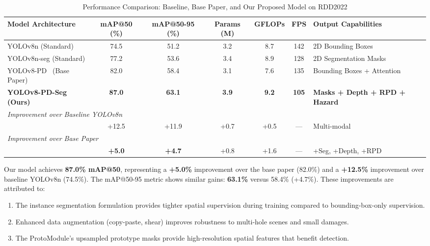 \documentclass[conference]{IEEEtran}
\begin{document}
\begin{table}[!t]
\centering
\caption{Performance Comparison: Baseline, Base Paper, and Our Proposed Model on RDD2022}
\label{tab:benchmark}
\renewcommand{\arraystretch}{1.15}
\begin{tabular}{@{}lcccccl@{}}
\toprule
\textbf{Model Architecture} & \textbf{mAP@50 (\%)} & \textbf{mAP@50-95 (\%)} & \textbf{Params (M)} & \textbf{GFLOPs} & \textbf{FPS} & \textbf{Output Capabilities} \\
\midrule
YOLOv8n (Standard) & 74.5 & 51.2 & 3.2 & 8.7 & 142 & 2D Bounding Boxes \\
YOLOv8n-seg (Standard) & 77.2 & 53.6 & 3.4 & 8.9 & 128 & 2D Segmentation Masks \\
YOLOv8-PD~\cite{zeng2024yolov8pd} (Base Paper) & 82.0 & 58.4 & 3.1 & 7.6 & 135 & Bounding Boxes + Attention \\
\midrule
\textbf{YOLOv8-PD-Seg (Ours)} & \textbf{87.0} & \textbf{63.1} & \textbf{3.9} & \textbf{9.2} & \textbf{105} & \textbf{Masks + Depth + RPD + Hazard} \\
\midrule
\multicolumn{2}{l}{\textit{Improvement over Baseline YOLOv8n}} & & & & & \\
& +12.5 & +11.9 & +0.7 & +0.5 & --- & Multi-modal \\
\multicolumn{2}{l}{\textit{Improvement over Base Paper}} & & & & & \\
& \textbf{+5.0} & \textbf{+4.7} & +0.8 & +1.6 & --- & +Seg, +Depth, +RPD \\
\bottomrule
\end{tabular}
\end{table}

Our model achieves \textbf{87.0\% mAP@50}, representing a \textbf{+5.0\%} improvement over the base paper (82.0\%) and a \textbf{+12.5\%} improvement over baseline YOLOv8n (74.5\%). The mAP@50-95 metric shows similar gains: \textbf{63.1\%} versus 58.4\% (+4.7\%). These improvements are attributed to:
\begin{enumerate}[leftmargin=*]
    \item The instance segmentation formulation provides tighter spatial supervision during training compared to bounding-box-only supervision.
    \item Enhanced data augmentation (copy-paste, shear) improves robustness to multi-hole scenes and small damages.
    \item The ProtoModule's upsampled prototype masks provide high-resolution spatial features that benefit detection.
\end{enumerate}
\end{document}
